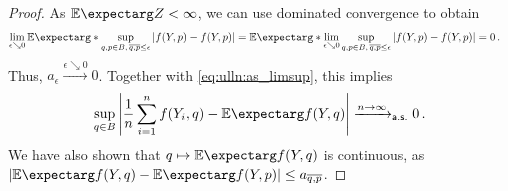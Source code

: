 \begin{proof}
As $\Ex{Z} < \infty$, we can use dominated convergence to obtain 
\begin{align*}
	\lim_{\epsilon\searrow0} 	\Ex*{\sup_{q,p\in B,\, \sol qp \leq \epsilon} \abs{f(Y, p) - f(Y, p)} }
	&=
	\Ex*{\lim_{\epsilon\searrow0}\sup_{q,p\in B,\, \sol qp \leq \epsilon} \abs{f(Y, p) - f(Y, p)} }
	=
	0
	\eqfs
\end{align*}
Thus, $a_\epsilon \xrightarrow{\epsilon\searrow0} 0$. Together with \eqref{eq:ulln:as_limsup}, this implies
\begin{equation*}
 \sup_{q\in B} \abs{\frac 1n \sum_{i=1}^n f(Y_i, q) - \Ex{f(Y, q)}} \xrightarrow{n \to \infty}_{\ms{a.s.}} 0
 \eqfs
\end{equation*}
We have also shown that $q\mapsto \Ex{f(Y, q)}$ is continuous, as $\abs{\Ex{f(Y, q)}-\Ex{f(Y, p)}} \leq a_{\sol qp}$.
\end{proof}
%